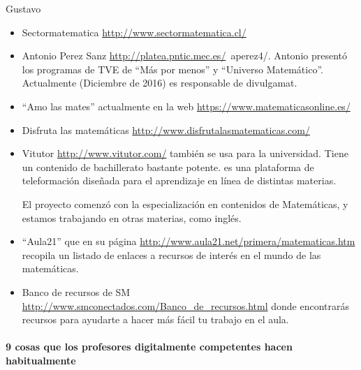 \begin{opin}{\guscolor}{Gustavo}
\begin{itemize}
\begin{itemize}
\item Sectormatematica \url{http://www.sectormatematica.cl/}  

\item Antonio Perez Sanz \url{http://platea.pntic.mec.es/}~aperez4/. Antonio presentó los programas de TVE de “Más por menos” y “Universo Matemático”. Actualmente (Diciembre de 2016) es responsable de divulgamat. 

\item “Amo las mates” actualmente en la web \url{https://www.matematicasonline.es/}  

\item Disfruta las matemáticas \url{http://www.disfrutalasmatematicas.com/}  

\item Vitutor \url{http://www.vitutor.com/} también se usa para la universidad. Tiene un contenido de bachillerato bastante potente. es una plataforma de teleformación diseñada para el aprendizaje en línea de distintas materias. 

El proyecto comenzó con la especialización en contenidos de Matemáticas, y estamos trabajando en otras materias, como inglés.

\item  “Aula21” que en su página \url{http://www.aula21.net/primera/matematicas.htm}  recopila un listado de enlaces a recursos de interés en el mundo de las matemáticas. 

\item Banco de recursos de SM \url{http://www.smconectados.com/Banco_de_recursos.html} donde encontrarás recursos para ayudarte a hacer más fácil tu trabajo en el aula. 
\end{itemize}
\end{itemize}

\paragraph{9 cosas que los profesores digitalmente competentes hacen habitualmente}



\end{opin}
